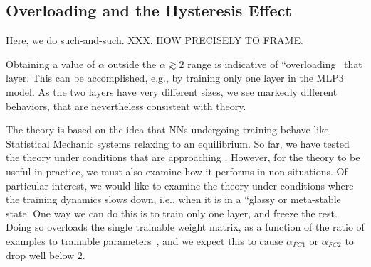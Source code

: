
\subsection{Overloading and the Hysteresis Effect}
\label{sxn:hysteresis_effect}

Here, we do such-and-such. 
XXX.  HOW PRECISELY TO FRAME.

Obtaining a value of $\alpha$ outside the $\alpha \gtrsim 2$ range is indicative of ``overloading~\cite{SST92,Gar88} that layer. 
This can be accomplished, e.g., by training only one layer in the MLP3 model.
As the two layers have very different sizes, we see markedly different behaviors, that are nevertheless consistent with theory.

The \SETOL theory is based on the idea that NNs undergoing training behave like Statistical Mechanic systems relaxing to an equilibrium. 
So far, we have tested the theory under conditions that are approaching \Ideal. 
However, for the theory to be useful in practice, we must also examine how it performs in non-\Ideal situations. 
Of particular interest, we would like to examine the theory under conditions where the training dynamics slows down, i.e., when it is in a ``glassy
or meta-stable state. 
One way we can do this is to train only one layer, and freeze the rest. 
Doing so overloads the single trainable weight matrix, as a function of the ratio of examples to trainable parameters~\cite{SST92,Gar88,MM17_TR}, and we expect this to cause $\alpha_{FC1}$ or $\alpha_{FC2}$ to drop well below $2$.


